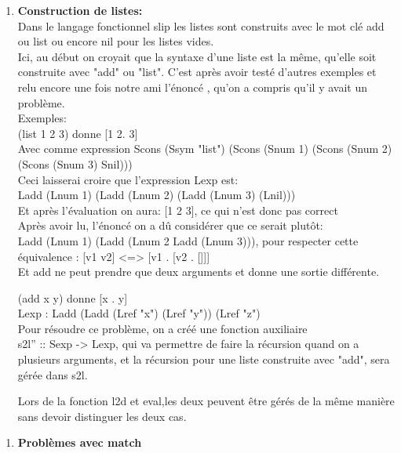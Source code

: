\documentclass{article}
\begin{document}
\begin{enumerate}
    \item 
    \textbf{Construction de listes:}\\
    Dans le langage fonctionnel slip les listes sont construits avec le mot clé add ou list ou encore nil pour les listes vides.\\
    Ici, au début on croyait que la syntaxe d'une liste est la même, qu'elle soit construite avec "add" ou "list". C'est après avoir testé d'autres exemples et relu encore une fois notre ami l'énoncé , qu'on a compris qu'il y avait un problème.\\
    Exemples:\\
      
      (list 1 2 3) donne  [1 2. 3]\\
      Avec comme expression Scons (Ssym "list") (Scons (Snum 1) (Scons (Snum 2) (Scons (Snum 3) Snil)))\\
      
      Ceci laisserai croire que l'expression Lexp est:\\ Ladd (Lnum 1) (Ladd (Lnum 2) (Ladd (Lnum 3) (Lnil)))\\
      
      Et après l'évaluation on aura: [1 2 3], ce qui n'est donc pas correct\\
      
     Après avoir lu, l'énoncé on a dû considérer que ce serait plutôt:\\
      Ladd (Lnum 1) (Ladd (Lnum 2 Ladd (Lnum 3))), pour respecter cette équivalence : [v1 v2] <=>  [v1 . [v2 . []]]\\
      
     Et add ne peut prendre que deux arguments et donne une sortie différente.
    
    (add x y) donne [x . y]\\Lexp :  Ladd (Ladd (Lref "x") (Lref "y")) (Lref "z")\\
    
    Pour résoudre ce problème, on a créé une fonction auxiliaire\\
    s2l'' :: Sexp -> Lexp, qui va permettre de faire la récursion quand on a plusieurs arguments, et la récursion pour une liste construite avec "add", sera gérée dans s2l.
    
    Lors de la fonction l2d et eval,les deux peuvent être gérés de la même manière sans devoir distinguer les deux cas.
    
\end{enumerate}

\begin{enumerate}
    \item 
    \textbf{Problèmes avec match}\\

\end{enumerate}
\end{document}
